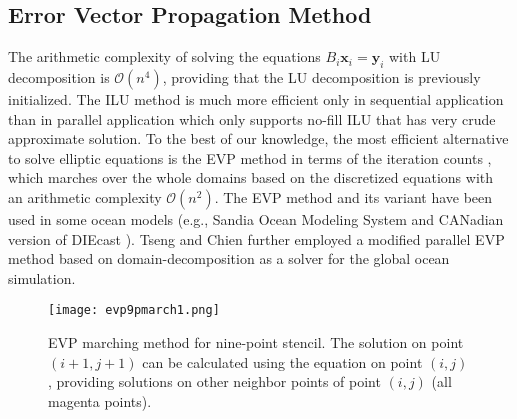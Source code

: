 \subsection{Error Vector Propagation Method}
The arithmetic complexity of solving the equations $B_i \textbf{x}_i = \textbf{y}_i$ with LU decomposition is $\mathcal{O}(n^4)$,
providing that the LU decomposition is previously initialized.
The ILU method is much more efficient only in sequential application than in parallel application
which only supports no-fill ILU that has very crude approximate solution. 
To the best of our knowledge, the most efficient alternative to solve elliptic equations is
the EVP method in terms of the iteration counts \cite{roache1995elliptic},
which marches over the whole domains based on the discretized equations with an arithmetic complexity $\mathcal{O}(n^2)$.
The EVP method and its variant have been used in some ocean models (e.g., Sandia Ocean Modeling System \cite{dietrich1987ocean} and CANadian version of DIEcast \cite{sheng1998candie}).
Tseng and Chien \cite{tseng2011parallel} further employed a modified parallel EVP method based on domain-decomposition as a solver for the global ocean simulation. 

\begin {figure}[!t]
\centering
\texttt{[image: evp9pmarch1.png]}
\caption []{EVP marching method for nine-point stencil. The solution on point $(i+1,j+1)$ can be calculated using the equation on point $(i,j)$, providing solutions on other neighbor points of point $(i,j)$ (all magenta points).  \label {fig:evp9p}}
\end {figure}

